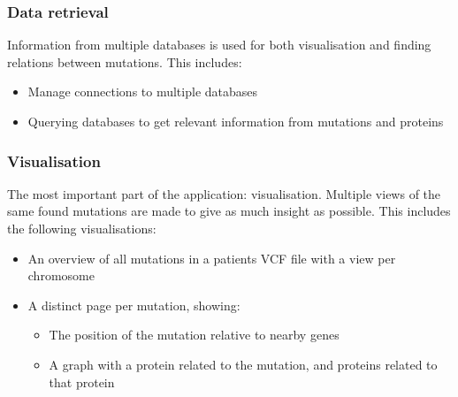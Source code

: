 \subsubsection{Data retrieval}

Information from multiple databases is used for both visualisation and finding relations between mutations. This includes:

\begin{itemize}
  \item Manage connections to multiple databases
  \item Querying databases to get relevant information from mutations and proteins
\end{itemize}

\subsubsection{Visualisation}

The most important part of the application: visualisation. Multiple views of the same found mutations are made to give as much insight as possible. This includes the following visualisations:

\begin{itemize}
  \item An overview of all mutations in a patients VCF file with a view per chromosome
  \item A distinct page per mutation, showing:
  \begin{itemize}
     \item The position of the mutation relative to nearby genes
     \item A graph with a protein related to the mutation, and proteins related to that protein
  \end{itemize}
\end{itemize}